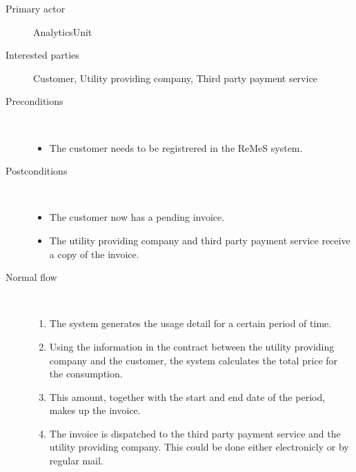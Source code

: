 \begin{description}
	\item[Primary actor] AnalyticsUnit
	\item[Interested parties] Customer, Utility providing company, Third party
	payment service
	\item[Preconditions] \ 
	\begin{itemize}
		\item The customer needs to be registrered in the ReMeS system.
	\end{itemize}
	\item[Postconditions] \ 
	\begin{itemize}
		\item The customer now has a pending invoice.
		\item The utility providing company and third party payment service receive a
		copy of the invoice.
	\end{itemize}
	\item[Normal flow] \ 
	\begin{enumerate}
	  	\item The system generates the usage detail for a certain period of time.
	  	\item Using the information in the contract between the utility providing
	  	company and the customer, the system calculates the total price for the
	  	consumption.
	  	\item This amount, together with the start and end date of the period, makes
	  	up the invoice.
	  	\item The invoice is dispatched to the third party payment
	  	service and the utility providing company. This could be done either
	  	electronicly or by regular mail.
	\end{enumerate}
\end{description}